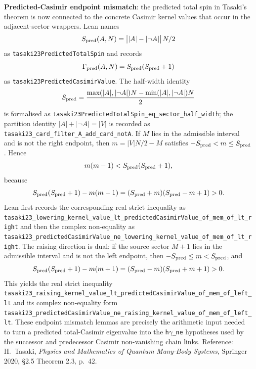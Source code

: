 \documentclass[a4paper,11pt]{article}
\begin{document}
\textbf{Predicted-Casimir endpoint mismatch}: the predicted total
spin in Tasaki's theorem is now connected to the concrete Casimir
kernel values that occur in the adjacent-sector wrappers.  Lean names
\[
  S_{\rm pred}(A,N)
    = \bigl||A|-|\neg A|\bigr|\,N/2
\]
as \texttt{tasaki23PredictedTotalSpin} and records
\[
  \Gamma_{\rm pred}(A,N)
    = S_{\rm pred}(S_{\rm pred}+1)
\]
as \texttt{tasaki23PredictedCasimirValue}.  The half-width identity
\[
  S_{\rm pred}
  = \frac{\max(|A|,|\neg A|)N-\min(|A|,|\neg A|)N}{2}
\]
is formalised as
\texttt{tasaki23PredictedTotalSpin\_eq\_sector\_half\_width}; the
partition identity \(|A|+|\neg A|=|V|\) is recorded as
\texttt{tasaki23\_card\_filter\_A\_add\_card\_notA}.  If
\(M\) lies in the admissible interval and is not the right endpoint,
then \(m=|V|N/2-M\) satisfies \(-S_{\rm pred}<m\le S_{\rm pred}\).
Hence
\[
  m(m-1)<S_{\rm pred}(S_{\rm pred}+1),
\]
because
\[
  S_{\rm pred}(S_{\rm pred}+1)-m(m-1)
  =(S_{\rm pred}+m)(S_{\rm pred}-m+1)>0.
\]
Lean first records the corresponding real strict inequality as
\texttt{tasaki23\_lowering\_kernel\_value\_lt\_predictedCasimirValue\_of\_mem\_of\_lt\_right}
and then the complex non-equality as
\texttt{tasaki23\_predictedCasimirValue\_ne\_lowering\_kernel\_value\_of\_mem\_of\_lt\_right}.
The raising direction is dual: if the source sector \(M+1\) lies in
the admissible interval and is not the left endpoint, then
\(-S_{\rm pred}\le m<S_{\rm pred}\), and
\[
  S_{\rm pred}(S_{\rm pred}+1)-m(m+1)
  =(S_{\rm pred}-m)(S_{\rm pred}+m+1)>0.
\]
This yields the real strict inequality
\texttt{tasaki23\_raising\_kernel\_value\_lt\_predictedCasimirValue\_of\_mem\_of\_left\_lt}
and its complex non-equality form
\texttt{tasaki23\_predictedCasimirValue\_ne\_raising\_kernel\_value\_of\_mem\_of\_left\_lt}.
These endpoint mismatch lemmas are precisely the arithmetic input
needed to turn a predicted total-Casimir eigenvalue into the
\texttt{h\(\gamma\)\_ne} hypotheses used by the successor and
predecessor Casimir non-vanishing chain links.  Reference: H.~Tasaki,
\emph{Physics and Mathematics of Quantum Many-Body Systems}, Springer
2020, \S2.5 Theorem 2.3, p.~42.
\end{document}
